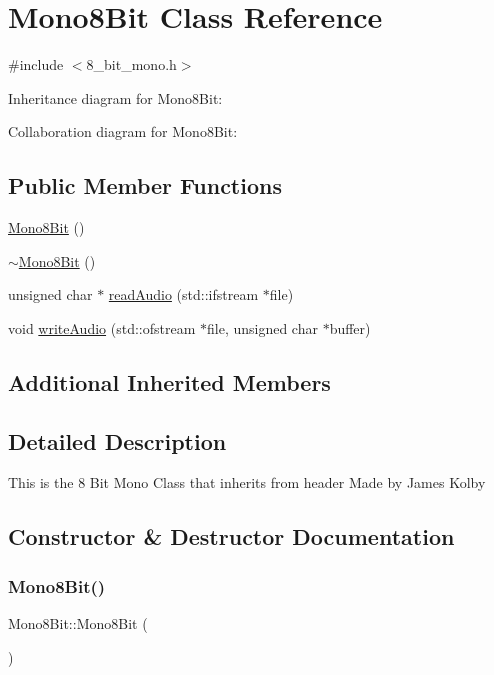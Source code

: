 \hypertarget{classMono8Bit}{}\section{Mono8\+Bit Class Reference}
\label{classMono8Bit}


{\ttfamily \#include $<$8\+\_\+bit\+\_\+mono.\+h$>$}



Inheritance diagram for Mono8\+Bit\+:


Collaboration diagram for Mono8\+Bit\+:
\subsection*{Public Member Functions}
\begin{DoxyCompactItemize}
\item 
\hyperlink{classMono8Bit_a3a5405abd5d5c1b4718161f12579ed24}{Mono8\+Bit} ()
\item 
\hyperlink{classMono8Bit_a6d80c16fde48f386ba940510fecf4df4}{$\sim$\+Mono8\+Bit} ()
\item 
unsigned char $\ast$ \hyperlink{classMono8Bit_a9239252fec82e2a816f90be56e13d9d1}{read\+Audio} (std\+::ifstream $\ast$file)
\item 
void \hyperlink{classMono8Bit_ad84865e5e90cf6c00382fcd5a7df620c}{write\+Audio} (std\+::ofstream $\ast$file, unsigned char $\ast$buffer)
\end{DoxyCompactItemize}
\subsection*{Additional Inherited Members}


\subsection{Detailed Description}
This is the 8 Bit Mono Class that inherits from header Made by James Kolby 

\subsection{Constructor \& Destructor Documentation}
\mbox{\label{classMono8Bit_a3a5405abd5d5c1b4718161f12579ed24}} 
\subsubsection{\texorpdfstring{Mono8\+Bit()}{Mono8Bit()}}
{\footnotesize\ttfamily Mono8\+Bit\+::\+Mono8\+Bit (\begin{DoxyParamCaption}{ }\end{DoxyParamCaption})}

